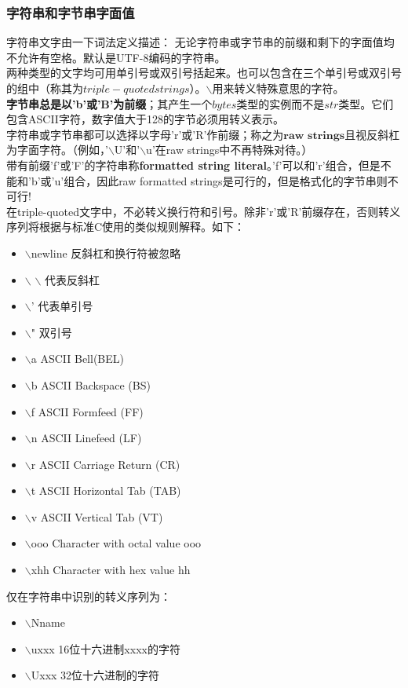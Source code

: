 \documentclass[10pt,UTF8]{ctexart}
\begin{document}
\subsubsection{字符串和字节串字面值}
字符串文字由一下词法定义描述：
\indent 无论字符串或字节串的前缀和剩下的字面值均不允许有空格。默认是UTF-8编码的字符串。\\
\indent 两种类型的文字均可用单引号或双引号括起来。也可以包含在三个单引号或双引号的组中（称其为$triple-quoted strings$）。$\backslash$用来转义特殊意思的字符。\\
\indent \textbf{字节串总是以'b'或'B'为前缀}；其产生一个$bytes$类型的实例而不是$str$类型。它们包含ASCII字符，数字值大于128的字节必须用转义表示。\\
\indent 字符串或字节串都可以选择以字母'r'或'R'作前缀；称之为$\textbf{raw strings}$且视反斜杠为字面字符。（例如，'$\backslash$U'和'$\backslash$u'在raw strings中不再特殊对待。）\\
\indent 带有前缀'f'或'F'的字符串称\textbf{formatted string literal}。'f'可以和'r'组合，但是不能和'b'或'u'组合，因此raw formatted strings是可行的，但是格式化的字节串则不可行!\\
\indent 在triple-quoted文字中，不必转义换行符和引号。除非'r'或'R'前缀存在，否则转义序列将根据与标准C使用的类似规则解释。如下：
\begin{itemize}
\item $\backslash$newline 反斜杠和换行符被忽略
\item $\backslash$ $\backslash$ 代表反斜杠
\item $\backslash$' 代表单引号
\item $\backslash$" 双引号
\item $\backslash$a ASCII Bell(BEL)
\item $\backslash$b ASCII Backspace (BS)
\item $\backslash$f ASCII Formfeed (FF)
\item $\backslash$n ASCII Linefeed (LF)
\item $\backslash$r ASCII Carriage Return (CR)
\item $\backslash$t ASCII Horizontal Tab (TAB)
\item $\backslash$v ASCII Vertical Tab (VT)
\item $\backslash$ooo Character with octal value ooo
\item $\backslash$xhh Character with hex value hh
\end{itemize}
仅在字符串中识别的转义序列为：
\begin{itemize}
\item $\backslash$N{name} 
\item $\backslash$uxxx 16位十六进制xxxx的字符
\item $\backslash$Uxxx 32位十六进制的字符
\end{itemize}
\end{document}
